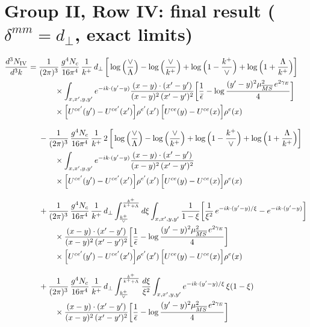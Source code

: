 \documentclass[10pt]{article}
\begin{document}
\section*{Group II, Row IV: final result ($\delta^{mm}=d_\perp$, exact limits)}
\begin{align}
\frac{d^{3}N_{\rm IV}}{d^{3}k}={}&\frac{1}{(2\pi)^{3}}\,\frac{g^{4}N_{c}}{16\pi^{4}}\,\frac{1}{k^{+}}\,d_{\perp}\,\bigg[\log\Big(\frac{\vee}{\Lambda}\Big)-\log\Big(\frac{\vee}{k^{+}}\Big)+\log\Big(1-\frac{k^{+}}{\vee}\Big)+\log\Big(1+\frac{\Lambda}{k^{+}}\Big)\bigg]\notag\\
&\qquad\times\int_{x,x',y,y'}e^{-ik\cdot(y'-y)}\frac{(x-y)\cdot(x'-y')}{(x-y)^{2}\,(x'-y')^{2}}\bigg[\frac{1}{\bar\epsilon}-\log\frac{(y'-y)^{2}\mu^{2}_{\overline{MS}}\,e^{2\gamma_{E}}}{4}\bigg]\notag\\
&\qquad\times\Big[U^{ce'}(y')-U^{ce'}(x')\Big]\rho^{e'}(x')\,\Big[U^{ce}(y)-U^{ce}(x)\Big]\rho^{e}(x)\notag\\[8pt]
&-\frac{1}{(2\pi)^{3}}\,\frac{g^{4}N_{c}}{16\pi^{4}}\,\frac{1}{k^{+}}\,2\,\bigg[\log\Big(\frac{\vee}{\Lambda}\Big)-\log\Big(\frac{\vee}{k^{+}}\Big)+\log\Big(1-\frac{k^{+}}{\vee}\Big)+\log\Big(1+\frac{\Lambda}{k^{+}}\Big)\bigg]\notag\\
&\qquad\times\int_{x,x',y,y'}e^{-ik\cdot(y'-y)}\frac{(x-y)\cdot(x'-y')}{(x-y)^{2}\,(x'-y')^{2}}\notag\\
&\qquad\times\Big[U^{ce'}(y')-U^{ce'}(x')\Big]\rho^{e'}(x')\,\Big[U^{ce}(y)-U^{ce}(x)\Big]\rho^{e}(x)\notag\\[8pt]
&+\frac{1}{(2\pi)^{3}}\,\frac{g^{4}N_{c}}{16\pi^{4}}\,\frac{1}{k^{+}}\,d_{\perp}\int_{\frac{k^{+}}{\vee}}^{\frac{k^{+}}{k^{+}+\Lambda}}d\xi\int_{x,x',y,y'}\frac{1}{1-\xi}\bigg[\frac{1}{\xi^{2}}\,e^{-ik\cdot(y'-y)/\xi}-e^{-ik\cdot(y'-y)}\bigg]\notag\\
&\qquad\times\frac{(x-y)\cdot(x'-y')}{(x-y)^{2}\,(x'-y')^{2}}\bigg[\frac{1}{\bar\epsilon}-\log\frac{(y'-y)^{2}\mu^{2}_{\overline{MS}}\,e^{2\gamma_{E}}}{4}\bigg]\notag\\
&\qquad\times\Big[U^{ce'}(y')-U^{ce'}(x')\Big]\rho^{e'}(x')\,\Big[U^{ce}(y)-U^{ce}(x)\Big]\rho^{e}(x)\notag\\[8pt]
&+\frac{1}{(2\pi)^{3}}\,\frac{g^{4}N_{c}}{16\pi^{4}}\,\frac{1}{k^{+}}\,d_{\perp}\int_{\frac{k^{+}}{\vee}}^{\frac{k^{+}}{k^{+}+\Lambda}}\frac{d\xi}{\xi^{2}}\int_{x,x',y,y'}e^{-ik\cdot(y'-y)/\xi}\,\xi(1-\xi)\notag\\
&\qquad\times\frac{(x-y)\cdot(x'-y')}{(x-y)^{2}\,(x'-y')^{2}}\bigg[\frac{1}{\bar\epsilon}-\log\frac{(y'-y)^{2}\mu^{2}_{\overline{MS}}\,e^{2\gamma_{E}}}{4}\bigg]\notag\\

\end{align}
\end{document}
